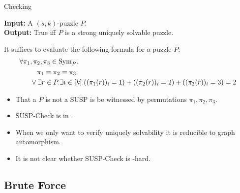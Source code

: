 \documentclass[t,10pt,
mathserif,xcolor=dvipsnames]{beamer}
\begin{document}
\begin{myframe}{Checking}

  \begin{problem}
    \textbf{Input:} A $(s,k)$-puzzle $P$. \\[1ex]
    \textbf{Output:} True iff $P$ is a strong uniquely solvable puzzle.
  \end{problem}

  It suffices to evaluate the following formula for a puzzle $P$:\\[-2ex]
  \begin{equation*}
    \begin{aligned}
      \forall \pi_1&,\pi_2, \pi_3 \in \mathrm{Sym}_{P}.\\ &~~~\pi_1 = \pi_2 = \pi_3 \\ &\vee \exists r \in P. \exists i \in [k]. ((\pi_1(r))_i = 1) + ((\pi_2(r))_i = 2) + ((\pi_3(r))_i = 3) = 2
    \end{aligned}
  \end{equation*}
  
  \begin{itemize}
  \item That a $P$ is not a SUSP is be witnessed by permutations
    $\pi_1, \pi_2, \pi_3$.
  \item SUSP-Check is in \coNP.
  \item When we only want to verify uniquely solvability it is
    reducible to graph automorphism.
  \item It is not clear whether SUSP-Check is \coNP-hard.
  \end{itemize}

  
\end{myframe}

\subsection{Brute Force}
\end{document}

